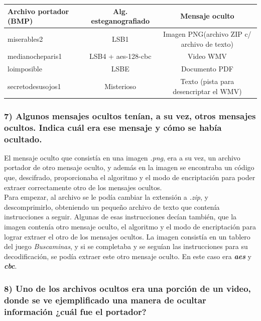 \documentclass[a4paper,10pt]{article}
\begin{document}
\begin{center}
\begin{tabular}{|l|c|c|}
    \hline
    Archivo portador (BMP)  & Alg. esteganografiado         & Mensaje oculto     \\
    \hline
    miserables2             & LSB1                          & Imagen PNG(archivo ZIP c/ archivo de texto)\\
    \hline
    medianocheparis1        & LSB4 + aes-128-cbc            & Video WMV \\
    \hline
    loimposible             & LSBE                          & Documento PDF\\
    \hline
    secretodesusojos1       & Misterioso                    & Texto (pista para desencriptar el WMV)\\
    \hline
\end{tabular}
\end{center}

\subsubsection*{ 7) Algunos mensajes ocultos tenían, a su vez, otros mensajes ocultos. Indica cuál era ese mensaje
y cómo se había ocultado.}

El mensaje oculto que consistía en una imagen \textit{.png}, era a su vez, un archivo portador de otro mensaje oculto, y además en la imagen se encontraba
un código que, descifrado, proporcionaba el algoritmo y el modo de encriptación para poder extraer correctamente otro de los mensajes ocultos. \\

Para empezar, al archivo se le podía cambiar la extensión a \textit{.zip}, y descomprimirlo, obteniendo un pequeño archivo de texto que contenía instrucciones a seguir.
Algunas de esas instrucciones decían también, que la imagen contenía otro mensaje oculto, el algoritmo y el modo de encriptación para lograr extraer el otro de los mensajes ocultos.
La imagen consistía en un tablero del juego \textit{Buscaminas}, y si se completaba y se seguían las instrucciones para su decodificación, se podía extraer este otro mensaje oculto.
En este caso era \textit{\textbf{aes}} y \textit{\textbf{cbc}}.

\subsubsection*{ 8) Uno de los archivos ocultos era una porción de un video, donde se ve ejemplificado una manera
de ocultar información ¿cuál fue el portador?}
\end{document}
